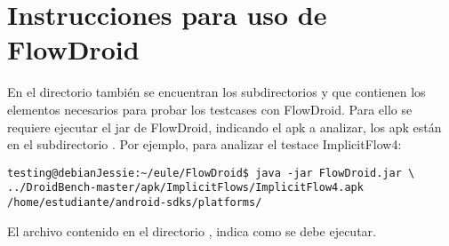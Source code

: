 \section{Instrucciones para uso de FlowDroid}
En el directorio \small{} también se encuentran
los subdirectorios \small{} y
\small{} que contienen los elementos necesarios
para probar los testcases con FlowDroid.\newline 
Para ello se requiere ejecutar el jar de FlowDroid, indicando el apk a analizar,
los apk están en el subdirectorio .
Por ejemplo, para analizar el testace ImplicitFlow4:
\begin{lstlisting}
testing@debianJessie:~/eule/FlowDroid$ java -jar FlowDroid.jar \
../DroidBench-master/apk/ImplicitFlows/ImplicitFlow4.apk
/home/estudiante/android-sdks/platforms/
\end{lstlisting}
El archivo \small{} contenido en el directorio
\small{\ttfamily{/FlowDroid}}, indica como se debe ejecutar.
